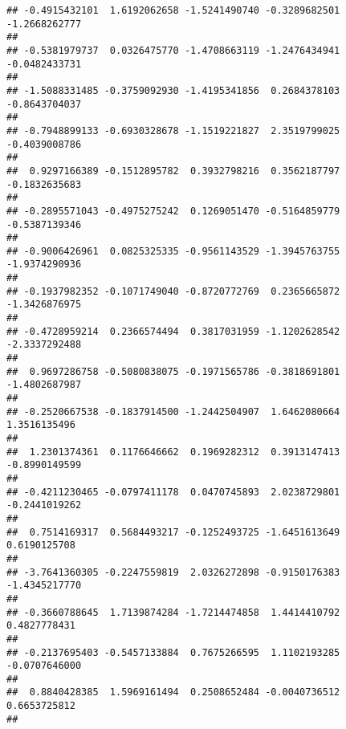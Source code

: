 \documentclass[]{article}
\begin{document}
\begin{verbatim}
## -0.4915432101  1.6192062658 -1.5241490740 -0.3289682501 -1.2668262777 
##                                                                       
## -0.5381979737  0.0326475770 -1.4708663119 -1.2476434941 -0.0482433731 
##                                                                       
## -1.5088331485 -0.3759092930 -1.4195341856  0.2684378103 -0.8643704037 
##                                                                       
## -0.7948899133 -0.6930328678 -1.1519221827  2.3519799025 -0.4039008786 
##                                                                       
##  0.9297166389 -0.1512895782  0.3932798216  0.3562187797 -0.1832635683 
##                                                                       
## -0.2895571043 -0.4975275242  0.1269051470 -0.5164859779 -0.5387139346 
##                                                                       
## -0.9006426961  0.0825325335 -0.9561143529 -1.3945763755 -1.9374290936 
##                                                                       
## -0.1937982352 -0.1071749040 -0.8720772769  0.2365665872 -1.3426876975 
##                                                                       
## -0.4728959214  0.2366574494  0.3817031959 -1.1202628542 -2.3337292488 
##                                                                       
##  0.9697286758 -0.5080838075 -0.1971565786 -0.3818691801 -1.4802687987 
##                                                                       
## -0.2520667538 -0.1837914500 -1.2442504907  1.6462080664  1.3516135496 
##                                                                       
##  1.2301374361  0.1176646662  0.1969282312  0.3913147413 -0.8990149599 
##                                                                       
## -0.4211230465 -0.0797411178  0.0470745893  2.0238729801 -0.2441019262 
##                                                                       
##  0.7514169317  0.5684493217 -0.1252493725 -1.6451613649  0.6190125708 
##                                                                       
## -3.7641360305 -0.2247559819  2.0326272898 -0.9150176383 -1.4345217770 
##                                                                       
## -0.3660788645  1.7139874284 -1.7214474858  1.4414410792  0.4827778431 
##                                                                       
## -0.2137695403 -0.5457133884  0.7675266595  1.1102193285 -0.0707646000 
##                                                                       
##  0.8840428385  1.5969161494  0.2508652484 -0.0040736512  0.6653725812 
##                                                                       

\end{verbatim}
\end{document}
